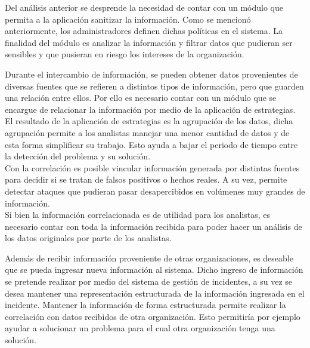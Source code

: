 	Del análisis anterior se desprende la necesidad de contar con un módulo que permita a la aplicación sanitizar la
	información. Como se mencionó anteriormente, los administradores definen dichas políticas en el sistema. La finalidad
	del módulo es analizar la información y filtrar datos que pudieran ser sensibles y que pusieran en riesgo los intereses
	de la organización.


\bigskip

	Durante el intercambio de información, se pueden obtener datos provenientes de diversas fuentes que se refieren a
	distintos tipos de información, pero que guarden una relación entre ellos. Por ello es necesario contar con un módulo
	que se encargue de relacionar la información por medio de la aplicación de estrategias. El resultado de la aplicación
	de estrategias es la agrupación de los datos, dicha agrupación permite a los analistas manejar una menor cantidad de
	datos y de esta forma simplificar su trabajo. Esto ayuda a bajar el periodo de tiempo entre la detección del problema y
	su solución.\\

	Con la correlación es posible vincular información generada por distintas fuentes para decidir si se tratan de falsos
	positivos o hechos reales. A su vez, permite detectar ataques que pudieran pasar desapercibidos en volúmenes muy
	grandes de información.\\

	Si bien la información correlacionada es de utilidad para los analistas, es necesario contar con toda la
	información recibida para poder hacer un análisis de los datos originales por parte de los analistas.


\bigskip

	Además de recibir información proveniente de otras organizaciones, es deseable que se pueda ingresar nueva información
	al sistema. Dicho ingreso de información se pretende realizar por medio del sistema de gestión de incidentes, a su vez
	se desea mantener una representación estructurada de la información ingresada en el incidente. Mantener la información
	de forma estructurada permite realizar la correlación con datos recibidos de otra organización. Esto permitiría por
	ejemplo ayudar a solucionar un problema para el cual otra organización tenga una solución.


